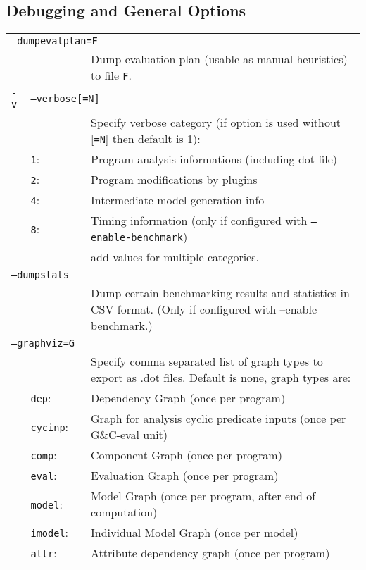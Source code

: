 \documentclass[a4paper, titlepage]{article}
\begin{document}
\subsection{Debugging and General Options}
\begin{center}
\begin{longtable}{p{2.2cm}  p{2.5cm} p{0.6cm} p{6.3cm}  }
\multicolumn{4}{l}{\texttt{--dumpevalplan=F}}\\
& & & Dump evaluation plan (usable as manual heuristics) to file \texttt{F}.\\
\texttt{-v}& \multicolumn{3}{l}{\texttt{--verbose[=N]}}\\
& & & Specify verbose category (if option is used without [\texttt{=N}] then default is 1):\\
&\texttt{1}:&& Program analysis informations (including dot-file)\\
&\texttt{2}:&& Program modifications by plugins\\
&\texttt{4}:&& Intermediate model generation info\\
&\texttt{8}:&& Timing information (only if configured with \texttt{\texttt{--enable-benchmark}})\\
&&&add values for multiple categories.\\
\multicolumn{4}{l}{\texttt{--dumpstats}}\\
& & & Dump certain benchmarking results and statistics in CSV format. (Only if configured with --enable-benchmark.)\\
\multicolumn{4}{l}{\texttt{--graphviz=G}}\\
& & & Specify comma separated list of graph types to export as .dot files. Default is none, graph types are:\\
&\texttt{dep}:&& Dependency Graph (once per program)\\
&\texttt{cycinp}:&& Graph for analysis cyclic predicate inputs (once per G\&C-eval unit)\\
&\texttt{comp}:&& Component Graph (once per program)\\
&\texttt{eval}:&& Evaluation Graph (once per program)\\
&\texttt{model}:&& Model Graph (once per program, after end of computation)\\
&\texttt{imodel}:&& Individual Model Graph (once per model)\\
&\texttt{attr}:&& Attribute dependency graph (once per program)\\

\end{longtable}
\end{center}
\end{document}
